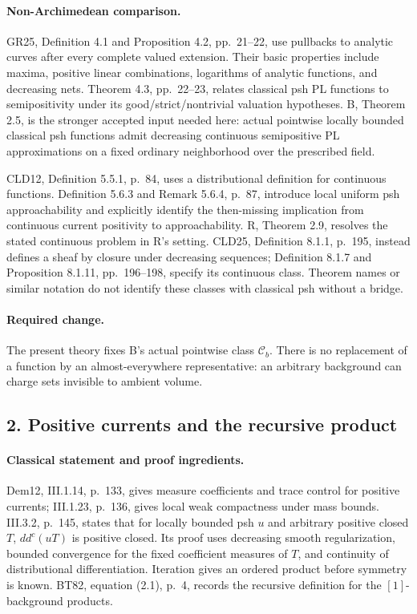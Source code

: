 \documentclass[11pt,a4paper]{article}
\numberwithin{equation}{section}
\theoremstyle{definition}
\theoremstyle{remark}
\begin{document}
\paragraph{Non-Archimedean comparison.}
GR25, Definition 4.1 and Proposition 4.2, pp.~21--22, use pullbacks to
analytic curves after every complete valued extension. Their basic
properties include maxima, positive linear combinations, logarithms of
analytic functions, and decreasing nets. Theorem 4.3, pp.~22--23, relates
classical psh PL functions to semipositivity under its good/strict/nontrivial
valuation hypotheses. B, Theorem 2.5, is the stronger accepted input
needed here: actual pointwise locally bounded classical psh functions admit
decreasing continuous semipositive PL approximations on a fixed ordinary
neighborhood over the prescribed field.\cite[\S4]{GR25}

CLD12, Definition 5.5.1, p.~84, uses a distributional definition for
continuous functions. Definition 5.6.3 and Remark 5.6.4, p.~87, introduce
local uniform psh approachability and explicitly identify the then-missing
implication from continuous current positivity to approachability. R,
Theorem 2.9, resolves the stated continuous problem in R's setting.
CLD25, Definition 8.1.1, p.~195, instead defines a sheaf by closure under
decreasing sequences; Definition 8.1.7 and Proposition 8.1.11,
pp.~196--198, specify its continuous class. Theorem names or similar
notation do not identify these classes with classical psh without a bridge.
\cite[\S\S5.5--5.6]{CLD12}\cite[\S8.1]{CLD25}

\paragraph{Required change.}
The present theory fixes B's actual pointwise class \(\mathcal C_b\).
There is no replacement of a function by an almost-everywhere representative:
an arbitrary background can charge sets invisible to ambient volume.

\subsection{2. Positive currents and the recursive product}

\paragraph{Classical statement and proof ingredients.}
Dem12, III.1.14, p.~133, gives measure coefficients and trace control for
positive currents; III.1.23, p.~136, gives local weak compactness under mass
bounds. III.3.2, p.~145, states that for locally bounded psh \(u\) and
arbitrary positive closed \(T\), \(dd^c(uT)\) is positive closed. Its proof
uses decreasing smooth regularization, bounded convergence for the fixed
coefficient measures of \(T\), and continuity of distributional
differentiation. Iteration gives an ordered product before symmetry is
known. BT82, equation (2.1), p.~4, records the recursive definition for the
\([1]\)-background products.\cite[III.1.14, III.1.23, III.3.2]{Dem12}
\cite[\S2, p.~4]{BT82}
\end{document}
